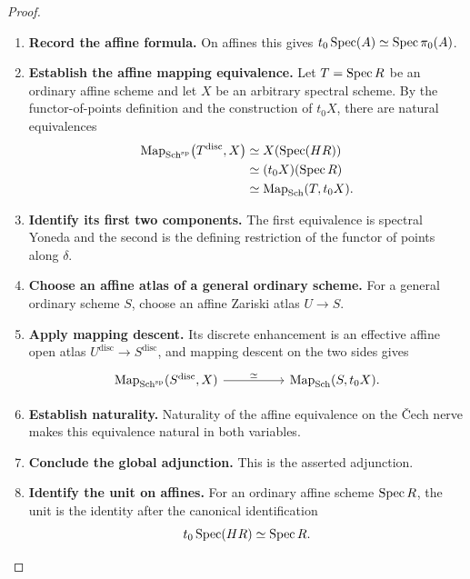 \begin{proof}
\begin{enumerate}[label=\textup{(\arabic*)}]
    \item \textbf{Record the affine formula.}
    On affines this gives
    \(t_0\operatorname{Spec}(A)\simeq\operatorname{Spec}\pi_0(A)\).

    \item \textbf{Establish the affine mapping equivalence.}
    Let \(T=\operatorname{Spec} R\) be an ordinary affine scheme and let \(X\) be an
    arbitrary spectral scheme. By the functor-of-points definition and the
    construction of \(t_0X\), there are natural equivalences
    \[
    \begin{aligned}
        \operatorname{Map}_{\operatorname{Sch}^{\mathrm{sp}}}
        \bigl(T^{\mathrm{disc}},X\bigr)
        &\simeq
        X(\operatorname{Spec}(HR))
        \\
        &\simeq
        (t_0X)(\operatorname{Spec} R)
        \\
        &\simeq
        \operatorname{Map}_{\operatorname{Sch}}(T,t_0X).
    \end{aligned}
    \]

    \item \textbf{Identify its first two components.}
    The first equivalence is spectral Yoneda and the second is the defining
    restriction of the functor of points along \(\delta\).

    \item \textbf{Choose an affine atlas of a general ordinary scheme.}
    For a general
    ordinary scheme \(S\), choose an affine Zariski atlas
    \(U\to S\).

    \item \textbf{Apply mapping descent.}
    Its discrete enhancement is an effective affine open atlas
    \(U^{\mathrm{disc}}\to S^{\mathrm{disc}}\), and mapping descent on the
    two sides gives
    \[
    \begin{tikzcd}[column sep=huge]
        \Map_{\operatorname{Sch}^{\mathrm{sp}}}(S^{\mathrm{disc}},X)
            \arrow[r, "\simeq"]
        &
        \Map_{\operatorname{Sch}}(S,t_0X).
    \end{tikzcd}
    \]

    \item \textbf{Establish naturality.}
    Naturality of the affine equivalence on the \v{C}ech nerve makes this
    equivalence natural in both variables.

    \item \textbf{Conclude the global adjunction.}
    This is the asserted adjunction.

    \item \textbf{Identify the unit on affines.}
    For an ordinary affine scheme \(\operatorname{Spec} R\), the unit is the identity after
    the canonical identification
    \[
        t_0\operatorname{Spec}(HR)\simeq\operatorname{Spec} R.
    \]


\end{enumerate}
\end{proof}
